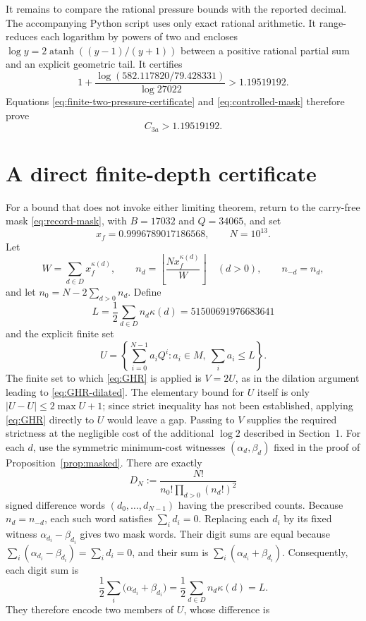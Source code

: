 \documentclass[11pt]{article}
\newcommand{\card}[1]{\lvert #1\rvert}
\begin{document}
It remains to compare the rational pressure bounds with the reported decimal.
The accompanying Python script uses only exact rational arithmetic.  It
range-reduces each logarithm by powers of two and encloses
$\log y=2\operatorname{atanh}((y-1)/(y+1))$ between a positive rational
partial sum and an explicit geometric tail.  It certifies
\[
 1+\frac{\log(582.117820/79.428331)}{\log27022}>1.19519192.
\]
Equations \eqref{eq:finite-two-pressure-certificate} and
\eqref{eq:controlled-mask} therefore prove
\begin{equation}\label{eq:controlled-certified}
 \boxed{C_{3a}>1.19519192}.
\end{equation}
\section{A direct finite-depth certificate}\label{sec:finite-certificate}
For a bound that does not invoke either limiting theorem, return to the
carry-free mask \eqref{eq:record-mask}, with $B=17032$ and
$Q=34065$, and set
\[
 x_f=0.9996789017186568,\qquad N=10^{13}.
\]
Let
\[
 W=\sum_{d\in D}x_f^{\kappa(d)},\qquad
 n_d=\left\lfloor\frac{N x_f^{\kappa(d)}}{W}\right\rfloor\quad(d>0),
 \qquad n_{-d}=n_d,
\]
and let $n_0=N-2\sum_{d>0}n_d$.  Define
\[
 L=\frac12\sum_{d\in D}n_d\kappa(d)
 =51500691976683641
\]
and the explicit finite set
\[
 U=\left\{\sum_{i=0}^{N-1}a_iQ^i:
 a_i\in M,\ \sum_i a_i\le L\right\}.
\]
The finite set to which \eqref{eq:GHR} is applied is $V=2U$, as in the
dilation argument leading to \eqref{eq:GHR-dilated}.  The elementary bound
for $U$ itself is only $\card{U-U}\le2\max U+1$; since strict inequality has
not been established, applying \eqref{eq:GHR} directly to $U$ would leave a
gap.  Passing to $V$ supplies the required strictness at the negligible cost
of the additional $\log2$ described in Section~1.
For each $d$, use the symmetric minimum-cost witnesses
$(\alpha_d,\beta_d)$ fixed in the proof of
Proposition~\ref{prop:masked}.  There are exactly
\[
 D_N:=\frac{N!}{n_0!\prod_{d>0}(n_d!)^2}
\]
signed difference words $(d_0,\ldots,d_{N-1})$ having the prescribed counts.
Because $n_d=n_{-d}$, each such word satisfies $\sum_i d_i=0$.  Replacing
each $d_i$ by its fixed witness $\alpha_{d_i}-\beta_{d_i}$ gives two mask
words.  Their digit sums are equal because
$\sum_i(\alpha_{d_i}-\beta_{d_i})=\sum_i d_i=0$, and their sum is
$\sum_i(\alpha_{d_i}+\beta_{d_i})$.  Consequently, each digit sum is
\[
 \frac12\sum_i\bigl(\alpha_{d_i}+\beta_{d_i}\bigr)
 =\frac12\sum_{d\in D}n_d\kappa(d)=L.
\]
They therefore encode two members of $U$, whose difference is
\end{document}
